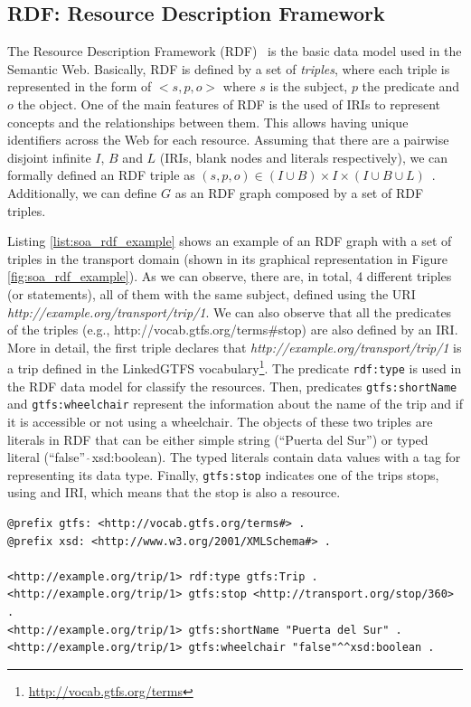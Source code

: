 \subsection{RDF: Resource Description Framework}
The Resource Description Framework (RDF)~\citep{RDF} is the basic data model used in the Semantic Web. Basically, RDF is defined by a set of \textit{triples}, where each triple is represented in the form of $<s,p,o>$ where $s$ is the subject, $p$ the predicate and $o$ the object. One of the main features of RDF is the used of IRIs to represent concepts and the relationships between them. This allows having unique identifiers across the Web for each resource. Assuming that there are a pairwise disjoint infinite $I$, $B$ and $L$ (IRIs, blank nodes and literals respectively), we can formally defined an RDF triple as $(s,p,o) \in (I \cup B) \times I \times (I \cup B \cup L)$~\citep{perez2009semantics}. Additionally, we can define $G$ as an RDF graph composed by a set of RDF triples.

Listing \ref{list:soa_rdf_example} shows an example of an RDF graph with a set of triples in the transport domain (shown in its graphical representation in Figure \ref{fig:soa_rdf_example}). As we can observe, there are, in total, 4 different triples (or statements), all of them with the same subject, defined using the URI \textit{http://example.org/transport/trip/1}. We can also observe that all the predicates of the triples (e.g., http://vocab.gtfs.org/terms\#stop) are also defined by an IRI. More in detail, the first triple declares that \textit{http://example.org/transport/trip/1} is a trip defined in the LinkedGTFS vocabulary\footnote{\url{http://vocab.gtfs.org/terms}}. The predicate \texttt{rdf:type} is used in the RDF data model for classify the resources. Then, predicates \texttt{gtfs:shortName} and \texttt{gtfs:wheelchair} represent the information about the name of the trip and if it is accessible or not using a wheelchair. The objects of these two triples are literals in RDF that can be either simple string (``Puerta del Sur'') or typed literal (``false''$\hat{\;}\hat{\;}$xsd:boolean). The typed literals contain data values with a tag for representing its data type. Finally, \texttt{gtfs:stop} indicates one of the trips stops, using and IRI, which means that the stop is also a resource. 


\begin{lstlisting}[float,caption=Example of RDF graph,frame=tlrb,label={list:soa_rdf_example}, columns=fullflexible]
@prefix gtfs: <http://vocab.gtfs.org/terms#> .
@prefix xsd: <http://www.w3.org/2001/XMLSchema#> .

<http://example.org/trip/1> rdf:type gtfs:Trip .
<http://example.org/trip/1> gtfs:stop <http://transport.org/stop/360> .
<http://example.org/trip/1> gtfs:shortName "Puerta del Sur" .
<http://example.org/trip/1> gtfs:wheelchair "false"^^xsd:boolean .
\end{lstlisting}

